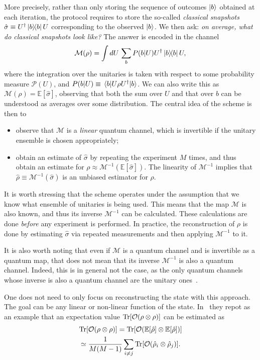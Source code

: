 \documentclass[12pt]{report}
\newcommand{\EE}{\mathbb{E}}
\newcommand{\calM}{{\mathcal{M}}}
\newcommand{\calO}{{\mathcal{O}}}
\newcommand{\calP}{{\mathcal{P}}}
\begin{document}
More precisely, rather than only storing the sequence of outcomes $\ket b$ obtained at each iteration, the protocol requires to store the so-called \textit{classical snapshots} $\hat\sigma\equiv U^\dagger \ketbra b U$ corresponding to the observed $\ket b$.
We then ask: \textit{on average, what do classical snapshots look like?} The answer is encoded in the channel
\begin{equation}
    \calM(\rho)
    = \int dU\,
    \sum_b P(b|U) U^\dagger \ketbra b U,
\end{equation}
where the integration over the unitaries is taken with respect to some probability measure $\calP(U)$, and $P(b|U)\equiv \mel{b}{U\rho U^\dagger}{b}$. We can also write this as $\calM(\rho)=\EE[\hat\sigma]$, observing that both the sum over $U$ and that over $b$ can be understood as averages over some distribution.
The central idea of the scheme is then to
\begin{itemize}
    \item observe that $\calM$ is a \textit{linear} quantum channel, which is invertible if the unitary ensemble is chosen appropriately;
    \item obtain an estimate of $\hat\sigma$ by repeating the experiment $M$ times, and thus obtain an estimate for $\rho\approx \calM^{-1}(\EE[\hat\sigma])$.
    The linearity of $\calM^{-1}$ implies that $\hat\rho\equiv \calM^{-1}(\hat\sigma)$ is an unbiased estimator for $\rho$.
\end{itemize}
It is worth stressing that the scheme operates under the assumption that we know what ensemble of unitaries is being used. This means that the map $\calM$ is also known, and thus its inverse $\calM^{-1}$ can be calculated. These calculations are done \textit{before} any experiment is performed.
In practice, the reconstruction of $\rho$ is done by estimating $\hat\sigma$ via repeated measurements and then applying $\calM^{-1}$ to it.

It is also worth noting that even if $\calM$ is a quantum channel and is invertible as a quantum map, that does not mean that its inverse $\calM^{-1}$ is also a quantum channel.
Indeed, this is in general not the case, as the only quantum channels whose inverse is also a quantum channel are the unitary ones~\parencite{watrous2018theory}.

One does not need to only focus on reconstructing the state with this approach. The goal can be any linear or non-linear function of the state.
In~\parencite{hu2021hamiltoniandriven} they repot as an example that an expectation value $\Tr[\calO(\rho\otimes\rho)]$ can be estimated as
\begin{equation}
\begin{gathered}
    \Tr[\calO(\rho\otimes\rho)]
    =\Tr[\calO(\EE[\hat\rho]\otimes\EE[\hat\rho])] \\
    \simeq
    \frac{1}{M(M-1)}
    \sum_{i\neq j}\Tr[\calO(\hat\rho_i\otimes\hat\rho_j)].
\end{gathered}
\end{equation}
\end{document}
